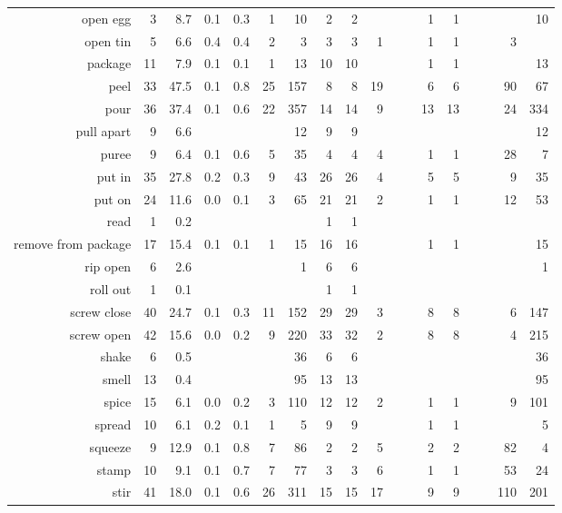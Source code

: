 \begin{tabular}{r r r r@{\ \ }r@{\ \ }r@{\ \ }r@{\ \ }r r@{\ \ }r@{\ \ }r@{\ \ }r@{\ \ }r@{\ \ }r@{\ \ }r@{\ \ }r@{\ \ }r@{\ \ }r}
open egg & 3 & 8.7 & 0.1 & 0.3 & 1 & 10 & 2 & 2 &  &  &  & 1 & 1 &  &  &  & 10 \\
open tin & 5 & 6.6 & 0.4 & 0.4 & 2 & 3 & 3 & 3 & 1 &  &  & 1 & 1 &  &  & 3 &  \\
package & 11 & 7.9 & 0.1 & 0.1 & 1 & 13 & 10 & 10 &  &  &  & 1 & 1 &  &  &  & 13 \\
peel & 33 & 47.5 & 0.1 & 0.8 & 25 & 157 & 8 & 8 & 19 &  &  & 6 & 6 &  &  & 90 & 67 \\
pour & 36 & 37.4 & 0.1 & 0.6 & 22 & 357 & 14 & 14 & 9 &  &  & 13 & 13 &  &  & 24 & 334 \\
pull apart & 9 & 6.6 &  &  &  & 12 & 9 & 9 &  &  &  &  &  &  &  &  & 12 \\
puree & 9 & 6.4 & 0.1 & 0.6 & 5 & 35 & 4 & 4 & 4 &  &  & 1 & 1 &  &  & 28 & 7 \\
put in & 35 & 27.8 & 0.2 & 0.3 & 9 & 43 & 26 & 26 & 4 &  &  & 5 & 5 &  &  & 9 & 35 \\
put on & 24 & 11.6 & 0.0 & 0.1 & 3 & 65 & 21 & 21 & 2 &  &  & 1 & 1 &  &  & 12 & 53 \\
read & 1 & 0.2 &  &  &  &  & 1 & 1 &  &  &  &  &  &  &  &  &  \\
remove from package & 17 & 15.4 & 0.1 & 0.1 & 1 & 15 & 16 & 16 &  &  &  & 1 & 1 &  &  &  & 15 \\
rip open & 6 & 2.6 &  &  &  & 1 & 6 & 6 &  &  &  &  &  &  &  &  & 1 \\
roll out & 1 & 0.1 &  &  &  &  & 1 & 1 &  &  &  &  &  &  &  &  &  \\
screw close & 40 & 24.7 & 0.1 & 0.3 & 11 & 152 & 29 & 29 & 3 &  &  & 8 & 8 &  &  & 6 & 147 \\
screw open & 42 & 15.6 & 0.0 & 0.2 & 9 & 220 & 33 & 32 & 2 &  &  & 8 & 8 &  &  & 4 & 215 \\
shake & 6 & 0.5 &  &  &  & 36 & 6 & 6 &  &  &  &  &  &  &  &  & 36 \\
smell & 13 & 0.4 &  &  &  & 95 & 13 & 13 &  &  &  &  &  &  &  &  & 95 \\
spice & 15 & 6.1 & 0.0 & 0.2 & 3 & 110 & 12 & 12 & 2 &  &  & 1 & 1 &  &  & 9 & 101 \\
spread & 10 & 6.1 & 0.2 & 0.1 & 1 & 5 & 9 & 9 &  &  &  & 1 & 1 &  &  &  & 5 \\
squeeze & 9 & 12.9 & 0.1 & 0.8 & 7 & 86 & 2 & 2 & 5 &  &  & 2 & 2 &  &  & 82 & 4 \\
stamp & 10 & 9.1 & 0.1 & 0.7 & 7 & 77 & 3 & 3 & 6 &  &  & 1 & 1 &  &  & 53 & 24 \\
stir & 41 & 18.0 & 0.1 & 0.6 & 26 & 311 & 15 & 15 & 17 &  &  & 9 & 9 &  &  & 110 & 201 \\

\end{tabular}
